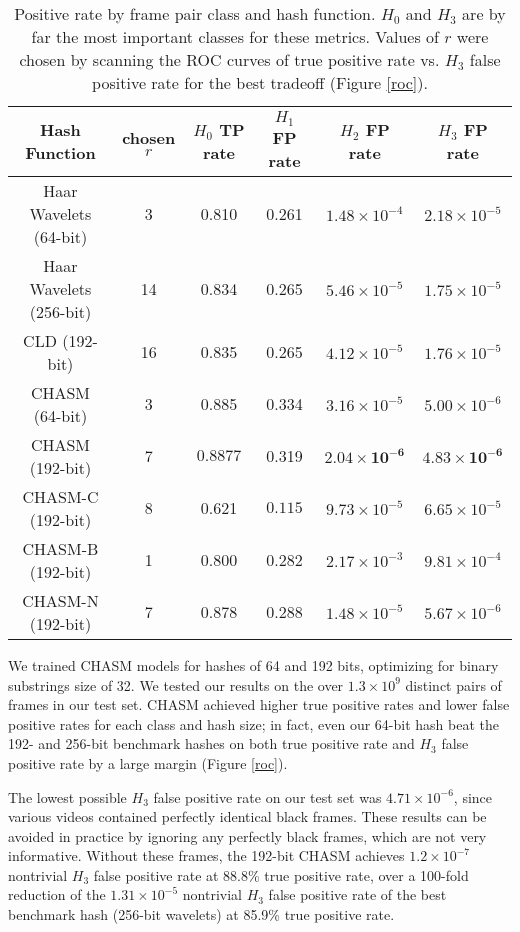 \documentclass{article}
\begin{document}
\begin{multicols}{2}
\begin{table*}
\caption{Positive rate by frame pair class and hash function. $H_0$ and $H_3$ are by far the most important classes for these metrics. Values of $r$ were chosen by scanning the ROC curves of true positive rate vs. $H_3$ false positive rate for the best tradeoff (Figure \ref{roc}).}
\begin{small}\begin{sc}\begin{center}
\begin{tabular}{|c|c|c|c|c|c|}
\hline
Hash Function & chosen $r$ & $H_0$ TP rate & $H_1$ FP rate & $H_2$ FP rate & $H_3$ FP rate \\ \hline
Haar Wavelets (64-bit) & 3 & 0.810 & 0.261 & $1.48\times10^{-4}$ & $2.18\times10^{-5}$ \\
Haar Wavelets (256-bit) & 14 & 0.834 & 0.265 & $5.46\times10^{-5}$ & $1.75\times10^{-5}$ \\
CLD (192-bit) & 16 & 0.835 & 0.265 & $4.12\times10^{-5}$ & $1.76\times10^{-5}$ \\
CHASM (64-bit) & 3 & 0.885 & 0.334 & $3.16\times10^{-5}$ & $5.00\times10^{-6}$ \\
CHASM (192-bit) & 7 & $\mathbf{0.8877}$ & 0.319 & $\mathbf{2.04\times10^{-6}}$ & $\mathbf{4.83\times10^{-6}}$ \\
CHASM-C (192-bit) & 8 & 0.621 & $\mathbf{0.115}$ & $9.73\times10^{-5}$ & $6.65\times10^{-5}$ \\
CHASM-B (192-bit) & 1 & 0.800 & 0.282 & $2.17\times10^{-3}$ & $9.81\times10^{-4}$ \\
CHASM-N (192-bit) & 7 & 0.878 & 0.288 & $1.48\times10^{-5}$ & $5.67\times10^{-6}$ \\
\hline
\end{tabular}
\end{center}\end{sc}\end{small}
\label{losses}
\end{table*}

We trained CHASM models for hashes of 64 and 192 bits, optimizing for binary substrings size of 32.
We tested our results on the over $1.3\times10^9$ distinct pairs of frames in our test set.
CHASM achieved higher true positive rates and lower false positive rates for each class and hash size; in fact, even our 64-bit hash beat the 192- and 256-bit benchmark hashes on both true positive rate and $H_3$ false positive rate by a large margin (Figure \ref{roc}).

The lowest possible $H_3$ false positive rate on our test set was $4.71\times10^{-6}$, since various videos contained perfectly identical black frames.
These results can be avoided in practice by ignoring any perfectly black frames, which are not very informative.
Without these frames, the 192-bit CHASM achieves $1.2\times10^{-7}$ nontrivial $H_3$ false positive rate at 88.8\% true positive rate, over a 100-fold reduction of the $1.31\times10^{-5}$ nontrivial $H_3$ false positive rate of the best benchmark hash (256-bit wavelets) at 85.9\% true positive rate.


\end{multicols}
\end{document}
